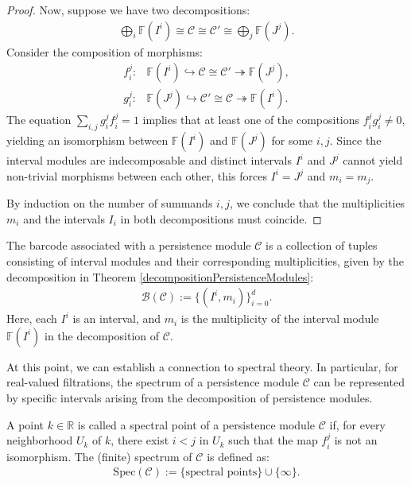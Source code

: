 \begin{proof}
Now, suppose we have two decompositions:
\begin{align}
	\bigoplus_i \mathbb{F}(I^i) \cong \mathcal{C} \cong \mathcal{C}' \cong \bigoplus_j \mathbb{F}(J^j).
\end{align}
Consider the composition of morphisms:
\begin{align}
	f_{i}^j: &\mathbb{F}(I^i) \hookrightarrow \mathcal{C} \cong \mathcal{C}' \twoheadrightarrow \mathbb{F}(J^j),\\
	g_{i}^j: &\mathbb{F}(J^j) \hookrightarrow \mathcal{C}' \cong \mathcal{C} \twoheadrightarrow \mathbb{F}(I^i).
\end{align}
The equation $\sum_{i,j} g_{i}^jf_{i}^j = 1$ implies that at least one of the compositions $f_{i}^jg_{i}^j \neq 0$, yielding an isomorphism between $\mathbb{F}(I^i)$ and $\mathbb{F}(J^j)$ for some $i, j$. Since the interval modules are indecomposable and distinct intervals $I^i$ and $J^j$ cannot yield non-trivial morphisms between each other, this forces $I^i = J^j$ and $m_i = m_j$. 

By induction on the number of summands $i,j$, we conclude that the multiplicities $m_i$ and the intervals $I_i$ in both decompositions must coincide.
\end{proof}

\begin{definition}
The barcode associated with a persistence module $\mathcal{C}$ is a collection of tuples consisting of interval modules and their corresponding multiplicities, given by the decomposition in Theorem \ref{decompositionPersistenceModules}:
\begin{align}
	\mathcal{B}(\mathcal{C}) := \{(I^i, m_i)\}_{i=0}^d.
\end{align}
Here, each $I^i$ is an interval, and $m_i$ is the multiplicity of the interval module $\mathbb{F}(I^i)$ in the decomposition of $\mathcal{C}$.
\end{definition}

At this point, we can establish a connection to spectral theory. In particular, for real-valued filtrations, the spectrum of a persistence module $\mathcal{C}$ can be represented by specific intervals arising from the decomposition of persistence modules.

\begin{definition}[Spectrum]
A point $k \in \mathbb{R}$ is called a spectral point of a persistence module $\mathcal{C}$ if, for every neighborhood $U_k$ of $k$, there exist $i < j$ in $U_k$ such that the map $f_{i}^j$ is not an isomorphism. The (finite) spectrum of $\mathcal{C}$ is defined as:
\begin{align}
	\text{Spec}(\mathcal{C}) := \{ \text{spectral points} \} \cup \{\infty\}.
\end{align}
\end{definition}

